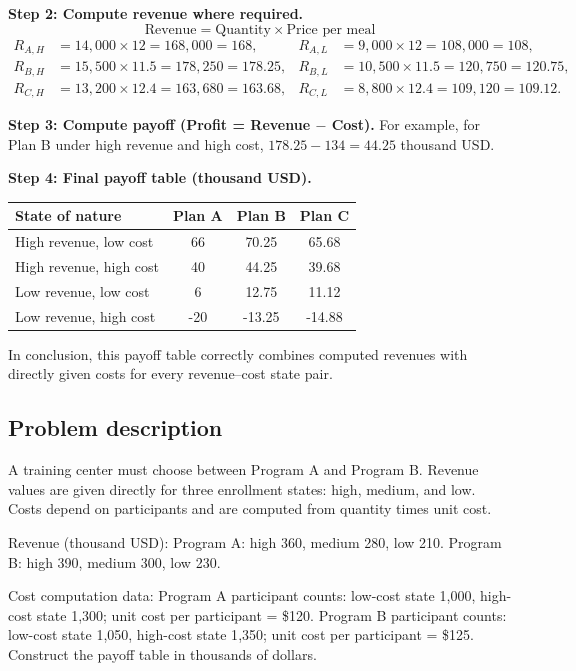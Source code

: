 \begin{ExamProblems}
		\textbf{Step 2: Compute revenue where required.}
		\[
		\text{Revenue} = \text{Quantity} \times \text{Price per meal}
		\]
		\[
		\begin{aligned}
		R_{A,H} &= 14{,}000\times12 = 168{,}000 = 168, & R_{A,L} &= 9{,}000\times12 = 108{,}000 = 108,\\
		R_{B,H} &= 15{,}500\times11.5 = 178{,}250 = 178.25, & R_{B,L} &= 10{,}500\times11.5 = 120{,}750 = 120.75,\\
		R_{C,H} &= 13{,}200\times12.4 = 163{,}680 = 163.68, & R_{C,L} &= 8{,}800\times12.4 = 109{,}120 = 109.12.
		\end{aligned}
		\]
		
		\textbf{Step 3: Compute payoff (Profit = Revenue $-$ Cost).}
		For example, for Plan B under high revenue and high cost,
		\(178.25-134=44.25\) thousand USD.
		
		\textbf{Step 4: Final payoff table (thousand USD).}
		\begin{center}
			\begin{tabular}{l c c c}
				\toprule
				State of nature & Plan A & Plan B & Plan C \\
				\midrule
				High revenue, low cost & 66 & 70.25 & 65.68 \\
				High revenue, high cost & 40 & 44.25 & 39.68 \\
				Low revenue, low cost & 6 & 12.75 & 11.12 \\
				Low revenue, high cost & -20 & -13.25 & -14.88 \\
				\bottomrule
			\end{tabular}
		\end{center}
		
		In conclusion, this payoff table correctly combines computed revenues with directly given costs for every revenue--cost state pair.
		
		\item
		\subsection*{Problem description}
		A training center must choose between Program A and Program B.
		Revenue values are given directly for three enrollment states: high, medium, and low.
		Costs depend on participants and are computed from quantity times unit cost.
		
		Revenue (thousand USD):
		Program A: high 360, medium 280, low 210.
		Program B: high 390, medium 300, low 230.
		
		Cost computation data:
		Program A participant counts: low-cost state 1{,}000, high-cost state 1{,}300;
		unit cost per participant = \$120.
		Program B participant counts: low-cost state 1{,}050, high-cost state 1{,}350;
		unit cost per participant = \$125.
		Construct the payoff table in thousands of dollars.
		

\end{ExamProblems}
